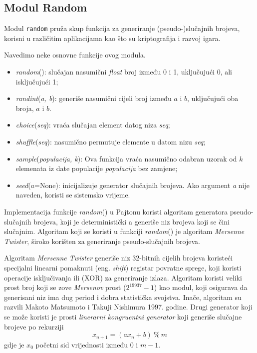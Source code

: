 \subsection{Modul Random}

Modul \texttt{random}  pruža skup funkcija za generiranje (pseudo-)slučajnih brojeva,   korisni u različitim aplikacijama kao što su  kriptografija i razvoj igara.

Navedimo neke osnovne funkcije ovog modula.

\begin{itemize}
	\item   \textit{random}():  slučajan nasumični \textit{float} broj između 0 i 1, uključujući 0, ali isključujući 1;
	\item \textit{randint}(\emph{a, b}):  generiše nasumični cijeli broj između $a$ i $b$, uključujući oba broja,  $a$ i $b$.
	\item  \textit{choice}(\emph{seq}):  vraća slučajan element datog niza \textit{seq}; 
	\item \textit{shuffle}(\emph{seq}): nasumično permutuje elemente u datom nizu \textit{seq};
	\item \textit{sample}(\emph{populacija, k}): Ova funkcija vraća nasumično odabran uzorak od $k$ elemenata iz date populacije  \textit{populacija} bez zamjene;
	\item \textit{seed}($a$=None): inicijalizuje generator slučajnih brojeva. Ako argument \textit{a} nije naveden, koristi se sistemsko vrijeme.
 
\end{itemize}

Implementacija funkcije \textit{random}() u Pajtonu koristi algoritam generatora pseudo-slučajnih brojeva, koji je deterministički a generiše niz brojeva koji se čini slučajnim. Algoritam koji se koristi u funkciji \textit{random}() je algoritam \textit{Mersenne Twister},  široko korišten   za generiranje pseudo-slučajnih brojeva.

Algoritam \textit{Mersenne Twister} generiše niz 32-bitnih cijelih brojeva koristeći specijalni linearni pomaknuti (eng. \textit{shift})  registar povratne sprege,  koji koristi operacije isključivanja ili (XOR) za generiranje izlaza. Algoritam koristi veliki prost broj koji se zove \textit{Mersenov} prost ($2^{19937}-1$) kao modul, koji osigurava da generisani niz ima dug period   i dobra statistička svojstva. Inače, algoritam su razvili Makoto Matsumoto i Takuji Nishimura 1997. godine. Drugi generator  koji se može koristi je prosti \textit{linerarni kongruentni generator} 
koji generiše  slučajne brojeve po rekurziji
$$ x_{n+1} = (a x_n + b)\ \%\ m $$
gdje je $x_0$ početni sid vrijednosti između 0 i $m-1$. 

